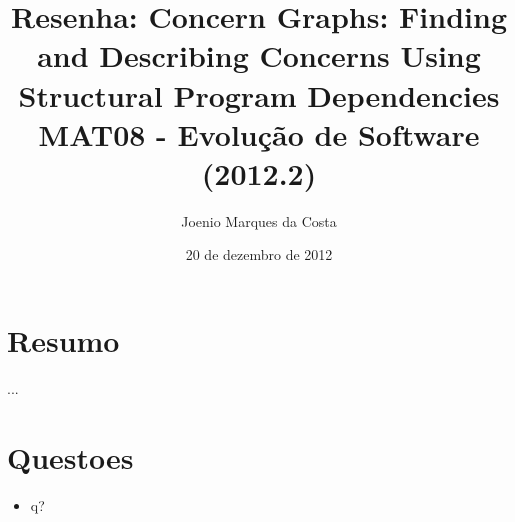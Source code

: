 \documentclass[12pt]{article}
\title{Resenha: Concern Graphs: Finding and Describing Concerns Using
 Structural Program Dependencies\cite{ConcernGraphs} \\
 \large MAT08 - Evolução de Software (2012.2)}
\author{Joenio Marques da Costa}
\date{20 de dezembro de 2012}
\begin{document}
\maketitle

\section*{Resumo}

...

\section*{Questoes}

\begin{itemize}
  \item q?
\end{itemize}


\end{document}
